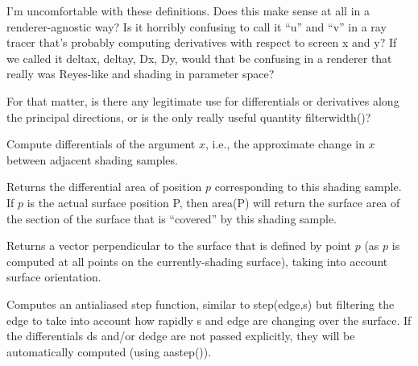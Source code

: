 \documentclass[11pt,letterpaper]{book}
\def\P{{\cf P}\xspace}
\begin{document}
\begin{annotate}
\QUESTION I'm uncomfortable with these definitions.  Does this make
sense at all in a renderer-agnostic way?  Is it horribly confusing to
call it ``u'' and ``v'' in a ray tracer that's probably computing
derivatives with respect to screen x and y?  If we called it deltax,
deltay, Dx, Dy, would that be confusing in a renderer that really was
Reyes-like and shading in parameter space?

For that matter, is there any legitimate use for differentials or
derivatives along the principal directions, or is the only really
useful quantity filterwidth()?
\end{annotate}

Compute differentials of the argument $x$, i.e., the approximate change
in $x$ between adjacent shading samples.
\apiend


Returns the differential area of position $p$ corresponding to this
shading sample.  If $p$ is the actual surface position \P, then 
{\ce area(P)} will return the surface area of the section of the
surface that is ``covered'' by this shading sample.
\apiend

Returns a vector perpendicular to the surface that is defined by point
$p$ (as $p$ is computed at all points on the currently-shading surface),
taking into account surface orientation.
\apiend

Computes an antialiased step function, similar to {\cf step(edge,s)} but
filtering the edge to take into account how rapidly {\cf s} and {\cf edge}
are changing over the surface.  If the differentials {\cf ds} and/or
{\cf dedge} are not passed explicitly, they will be automatically 
computed (using {\cf aastep()}).
\end{document}
